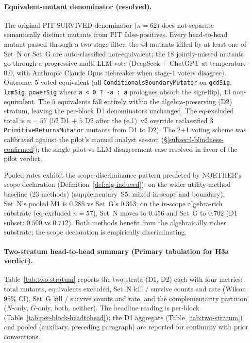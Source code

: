 \documentclass[manuscript]{acmart}
\begin{document}
\paragraph{Equivalent-mutant denominator (resolved).}\label{para:eq-mutant-footnote}
The original PIT-SURVIVED denominator ($n = 62$) does not separate semantically distinct mutants from PIT false-positives. Every head-to-head mutant passed through a two-stage filter: the $44$ mutants killed by at least one of Set~N or Set~G are auto-classified non-equivalent; the $18$ jointly-missed mutants go through a progressive multi-LLM vote (DeepSeek + ChatGPT at temperature $0.0$, with Anthropic Claude Opus tiebreaker when stage-1 voters disagree). Outcome: $5$ voted equivalent (all \texttt{ConditionalsBoundaryMutator} on \texttt{gcdSig}, \texttt{lcmSig}, \texttt{powerSig} where \texttt{a < 0 ? -a : a} prologues absorb the sign-flip), $13$ non-equivalent. The $5$ equivalents fall entirely within the algebra-preserving (D2) stratum, leaving the per-block D1 denominators unchanged. The eq-excluded total is $n = 57$ ($52$ D1 + $5$ D2 after the (e.1)~v2 override reclassified $3$ \texttt{PrimitiveReturnsMutator} mutants from D1 to D2). The 2+1 voting scheme was calibrated against the pilot's manual analyst session (\S\ref{subsec:l-blindness-confirmed}); the single pilot-vs-LLM disagreement case resolved in favor of the pilot verdict.

Pooled rates exhibit the scope-discriminance pattern predicted by NOETHER's scope declaration (Definition~\ref{def:alg-induced}): on the wider utility-method baseline (23 methods) (supplementary~S5; mixed in-scope and boundary), Set~N's pooled M1 is $0.288$ vs Set~G's $0.363$; on the in-scope algebra-rich substrate (eq-excluded $n = 57$), Set~N moves to $0.456$ and Set~G to $0.702$ (D1 subset: $0.500$ vs $0.712$). Both methods benefit from the algebraically richer substrate; the scope declaration is empirically discriminating.

\paragraph{Two-stratum head-to-head summary (Primary tabulation for H3a verdict).}
\label{para:two-stratum}
Table~\ref{tab:two-stratum} reports the two strata (D1, D2) each
with four metrics: total mutants, equivalents excluded, Set~N kill
/ survive counts and rate (Wilson 95\% CI), Set~G kill / survive
counts and rate, and the complementarity partition ($N$-only,
$G$-only, both, neither). The headline reading is per-block
(Table~\ref{tab:per-block-headtohead}); the D1 aggregate
(Table~\ref{tab:two-stratum}) and pooled (auxiliary, preceding
paragraph) are reported for continuity with prior conventions.
\end{document}
